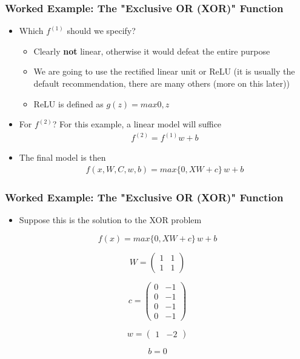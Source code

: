 \documentclass[
  shownotes,
  xcolor={svgnames},
  hyperref={colorlinks,citecolor=DarkBlue,linkcolor=DarkRed,urlcolor=DarkBlue}
  , aspectratio=169]{beamer}
\begin{document}
\begin{frame}
\frametitle{Worked Example: The "Exclusive OR (XOR)" Function}

\begin{itemize}
    \item Which $f^{(1)}$ should we specify?
    \medskip
    \begin{itemize}
    \item Clearly {\bf not} linear, otherwise it would defeat the entire purpose
    \item We are going to use the rectified linear unit or ReLU (it is usually the default recommendation, there are many others (more on this later))
    \item ReLU is defined as $g(z)=max{0,z}$
    \end{itemize}
    
    \item For $f^{(2)}$? For this example, a linear model will suffice 
    \medskip
    \begin{align}
    f^{(2)} = f^{(1)}w + b
    \end{align}
    \item The final model is then 
    \begin{align}
    f(x,W,C,w,b) = max\{0,XW+c\}\,w + b
    \end{align}
\end{itemize}

\end{frame}
\begin{frame}
\frametitle{Worked Example: The "Exclusive OR (XOR)" Function}

\begin{itemize}
\item Suppose this is the solution to the XOR problem 
\end{itemize}


\[
f(x)=max\{0,XW+c\}\,w+b
\]

\[
W=\left(\begin{array}{cc}
1 & 1\\
1 & 1
\end{array}\right)
\]

\[
c=\left(\begin{array}{cc}
0 & -1\\
0 & -1\\
0 & -1\\
0 & -1
\end{array}\right)
\]

\[
w=\left(\begin{array}{cc}
1 & -2\end{array}\right)
\]

 \[
 b = 0
 \]


\end{frame}
\end{document}
